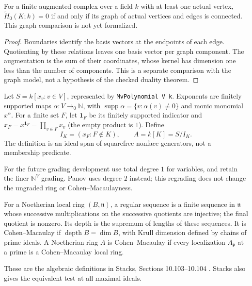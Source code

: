 \begin{lemma}\label{lem:homology-connectivity}
For a finite augmented complex over a field $k$ with at least one actual vertex,
$\widetilde H_0(K;k)=0$ if and only if its graph of actual vertices and
edges is connected. This graph comparison is not yet formalized.
\end{lemma}
\begin{proof}
Boundaries identify the basis vectors at the endpoints of each edge.
Quotienting by these relations leaves one basis vector per graph component.
The augmentation is the sum of their coordinates, whose kernel has dimension
one less than the number of components. This is a separate comparison with
the graph model, not a hypothesis of the checked duality theorem.
\end{proof}

\begin{definition}\label{def:ring}
\leanok
Let $S=k[x_v:v\in V]$, represented by \texttt{MvPolynomial V k}.
Exponents are finitely
supported maps $\alpha:V\to_0\mathbb N$, with
$\operatorname{supp}\alpha=\{v:\alpha(v)\ne0\}$ and monic monomial $x^\alpha$.
For a finite set $F$, let $\mathbf1_F$ be its finitely supported indicator
and $x_F=x^{\mathbf1_F}=\prod_{v\in F}x_v$ (the empty product is $1$).
Define
\[
 I_K=(x_F:F\notin K),\qquad A=k[K]=S/I_K.
\]
The definition is an ideal span of squarefree nonface generators, not a
membership predicate.
\end{definition}
For the future grading development use total degree $1$ for variables, and retain
the finer $\mathbb N^V$ grading. Panov uses degree $2$ instead; this regrading
does not change the ungraded ring or Cohen--Macaulayness.

\begin{definition}\label{def:cm}
For a Noetherian local ring $(B,\mathfrak n)$, a regular sequence is a finite
sequence in $\mathfrak n$ whose successive multiplications on the successive
quotients are injective; the final quotient is nonzero. Its depth is the
supremum of lengths of these sequences. It is Cohen--Macaulay if
$\operatorname{depth} B=\dim B$, with Krull dimension defined by chains of
prime ideals. A Noetherian ring $A$ is Cohen--Macaulay if every localization
$A_{\mathfrak p}$ at a prime is a Cohen--Macaulay local ring.
\leanok
\end{definition}
These are the algebraic definitions in Stacks, Sections 10.103--10.104
\cite{stacks-cm}. Stacks also gives the equivalent test at all maximal ideals.

